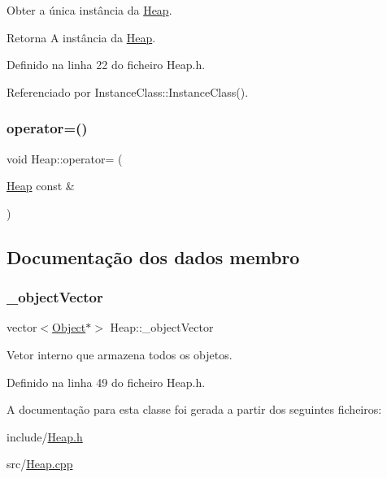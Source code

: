 Obter a única instância da \hyperlink{classHeap}{Heap}. 

\begin{DoxyReturn}{Retorna}
A instância da \hyperlink{classHeap}{Heap}. 
\end{DoxyReturn}


Definido na linha 22 do ficheiro Heap.\+h.



Referenciado por Instance\+Class\+::\+Instance\+Class().

\mbox{\label{classHeap_a2923f4b4b05267583815e185f2e28b7d}} 
\subsubsection{\texorpdfstring{operator=()}{operator=()}}
{\footnotesize\ttfamily void Heap\+::operator= (\begin{DoxyParamCaption}\item[{\hyperlink{classHeap}{Heap} const \&}]{ }\end{DoxyParamCaption})\hspace{0.3cm}{\ttfamily [private]}}



\subsection{Documentação dos dados membro}
\mbox{\label{classHeap_a55b6cf9504fbe890a49e667c80dae717}} 
\subsubsection{\texorpdfstring{\+\_\+object\+Vector}{\_objectVector}}
{\footnotesize\ttfamily vector$<$\hyperlink{classObject}{Object}$\ast$$>$ Heap\+::\+\_\+object\+Vector\hspace{0.3cm}{\ttfamily [private]}}

Vetor interno que armazena todos os objetos. 

Definido na linha 49 do ficheiro Heap.\+h.



A documentação para esta classe foi gerada a partir dos seguintes ficheiros\+:\begin{DoxyCompactItemize}
\item 
include/\hyperlink{Heap_8h}{Heap.\+h}\item 
src/\hyperlink{Heap_8cpp}{Heap.\+cpp}\end{DoxyCompactItemize}
